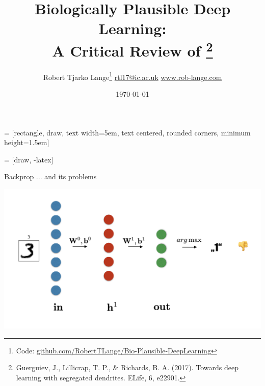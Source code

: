 \documentclass[dvipsnames, usenames]{beamer}
\begin{document}

 = [rectangle, draw, 
    text width=5em, text centered, rounded corners, minimum height=1.5em]
    
 = [draw, -latex]

\title{Biologically Plausible Deep Learning: \\ A Critical Review of \citet{guerguiev2017} \thanks{Guerguiev, J., Lillicrap, T. P., \& Richards, B. A. (2017). Towards deep learning with segregated dendrites. ELife, 6, e22901.}}
\subtitle{}

\author{\texorpdfstring{Robert Tjarko Lange\thanks{Code: \url{github.com/RobertTLange/Bio-Plausible-DeepLearning}}
						\newline\url{rtl17@ic.ac.uk}
						\newline\url{www.rob-lange.com}
	}
	{Author}}


\date{\today}



\begin{frame}[noframenumbering]

\titlepage
\end{frame}

\begin{frame}{Backprop ... and its problems}

\centering 
\includegraphics[width=1.1\textwidth]{../figures/report/bp_1}
\end{frame}
\end{document}
